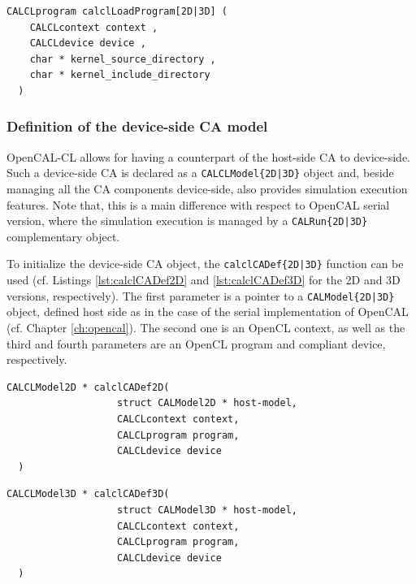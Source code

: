 \begin{lstlisting}[float,floatplacement=H, label=lst:calclLoadProgram, caption={The calclLoadProgram function. It loads and compiles kernels by returning an OpenCL program.}, numbers=none]
  CALCLprogram calclLoadProgram[2D|3D] (
    CALCLcontext context ,
    CALCLdevice device ,
    char * kernel_source_directory ,
    char * kernel_include_directory
  )
\end{lstlisting}

\subsubsection{Definition of the device-side CA model}

OpenCAL-CL allows for having a counterpart of the host-side CA to
device-side. Such a device-side CA is declared as a
\verb'CALCLModel{2D|3D}' object and, beside managing all the CA
components device-side, also provides simulation execution
features. Note that, this is a main difference with respect to OpenCAL
serial version, where the simulation execution is managed by a
\verb'CALRun{2D|3D}' complementary object.

To initialize the device-side CA object, the \verb'calclCADef{2D|3D}'
function can be used (cf. Listings \ref{lst:calclCADef2D} and
\ref{lst:calclCADef3D} for the 2D and 3D versions, respectively). The
first parameter is a pointer to a \verb'CALModel{2D|3D}' object,
defined host side as in the case of the serial implementation of
OpenCAL (cf. Chapter \ref{ch:opencal}). The second one is an OpenCL
context, as well as the third and fourth parameters are an OpenCL
program and compliant device, respectively.


\begin{lstlisting}[float,floatplacement=H, label=lst:calclCADef2D, caption=The calclCADef2D function., numbers=none]
  CALCLModel2D * calclCADef2D(
                   struct CALModel2D * host-model,
                   CALCLcontext context,
                   CALCLprogram program,
                   CALCLdevice device
  )
\end{lstlisting}

\begin{lstlisting}[float,floatplacement=H, label=lst:calclCADef3D, caption=The calclCADef3D function., numbers=none]
  CALCLModel3D * calclCADef3D(
                   struct CALModel3D * host-model,
                   CALCLcontext context,
                   CALCLprogram program,
                   CALCLdevice device
  )
\end{lstlisting}


